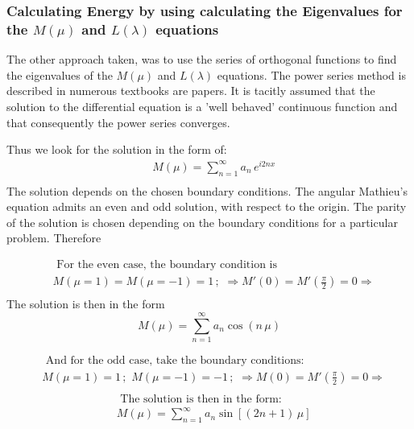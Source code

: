 \subsubsection{Calculating Energy by using calculating the Eigenvalues for the $ M(\mu) $ and $ L(\lambda) $ equations }

The other approach taken, was to use the series of orthogonal functions to find the eigenvalues of the $ M(\mu) $ and $ L(\lambda) $ equations. The power series method is described in numerous textbooks are papers. It is tacitly assumed that the solution to the differential equation is a 'well behaved' continuous function and that consequently the power series converges.

Thus we look for the solution in the form of:
\begin{equation}\label{MSol}
\begin{split}
& M(\mu) = \sum_{n=1}^{\infty}{a_n\,e^{i2nx}} \\[.8em]
\end{split}
\end{equation}
The solution depends on the chosen boundary conditions. The angular Mathieu's equation admits an even and odd solution, with respect to the origin. The parity of the solution is chosen depending on the boundary conditions for a particular problem. Therefore

\begin{equation}
\begin{split}
& \text{ For the even case, the boundary condition is } \\[.8em]
& M(\mu = 1) = M(\mu = -1) = 1\,;\,\,\Rightarrow  M'(0) = M'\left(\frac{\pi}{2}\right) = 0 \Rightarrow \\[.8em] 
\end{split}
\end{equation}
The solution is then in the form \\[.8em]
\begin{equation}\label{Meven}
M(\mu) = \sum_{n=1}^{\infty}{a_n \cos\left(n\,\mu\right)}
\end{equation}

\begin{equation}\label{Modd1}
\begin{split}
& \text{ And for the odd case, take the boundary conditions: } \\[.8em]
& M(\mu = 1) = 1\,;\,\,M(\mu = -1) = -1\,;\,\,\Rightarrow  M(0) = M'\left(\frac{\pi}{2}\right) = 0 \Rightarrow \\[.8em] 
\end{split}
\end{equation}
\begin{equation}\label{Modd2}
\begin{split}
& \text{ The solution is then in the form: } \\[.8em]
& M(\mu) = \sum_{n=1}^{\infty}{a_n \sin\left[\left(2n+1\right)\,\mu\right]} 
\end{split}
\end{equation}

